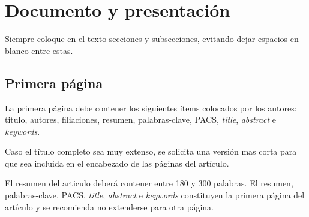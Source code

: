 \documentclass[12pt, a4paper, twoside, twocolumn]{article}
\begin{document}
\section{Documento y presentación}

Siempre coloque en el texto secciones y subsecciones, evitando dejar espacios en blanco entre estas.

\subsection{Primera página}

La primera página debe contener los siguientes ítems colocados por los autores: titulo, autores, filiaciones, resumen, palabras-clave, PACS, \textit{title}, \textit{abstract} e \textit{keywords}. 
%

Caso el título completo sea muy extenso, se solicita una versión mas corta para que sea incluida en el encabezado de las páginas del artículo.

El resumen del articulo deberá contener entre 180 y 300 palabras. El resumen, palabras-clave, PACS, \textit{title}, \textit{abstract} e \textit{keywords} constituyen la primera página del artículo y se recomienda no extenderse para otra página.
\end{document}
